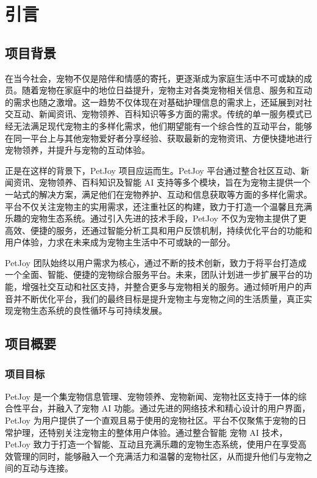 \section{引言}\label{sec:Introduction}

\subsection{项目背景}

在当今社会，宠物不仅是陪伴和情感的寄托，更逐渐成为家庭生活中不可或缺的成员。随着宠物在家庭中的地位日益提升，宠物主对各类宠物相关信息、服务和互动的需求也随之激增。这一趋势不仅体现在对基础护理信息的需求上，还延展到对社交互动、新闻资讯、宠物领养、百科知识等多方面的需求。传统的单一服务模式已经无法满足现代宠物主的多样化需求，他们期望能有一个综合性的互动平台，能够在同一平台上与其他宠物爱好者分享经验、获取最新的宠物资讯、方便快捷地进行宠物领养，并提升与宠物的互动体验。

正是在这样的背景下，PetJoy 项目应运而生。PetJoy 平台通过整合社区互动、新闻资讯、宠物领养、百科知识及智能 AI 支持等多个模块，旨在为宠物主提供一个一站式的解决方案，满足他们在宠物养护、互动和信息获取等方面的多样化需求。平台不仅关注宠物主的实用需求，还注重社区的构建，致力于打造一个温馨且充满乐趣的宠物生态系统。通过引入先进的技术手段，PetJoy 不仅为宠物主提供了更高效、便捷的服务，还通过智能分析工具和用户反馈机制，持续优化平台的功能和用户体验，力求在未来成为宠物主生活中不可或缺的一部分。

PetJoy 团队始终以用户需求为核心，通过不断的技术创新，致力于将平台打造成一个全面、智能、便捷的宠物综合服务平台。未来，团队计划进一步扩展平台的功能，增强社交互动和社区支持，并整合更多与宠物相关的服务。通过倾听用户的声音并不断优化平台，我们的最终目标是提升宠物主与宠物之间的生活质量，真正实现宠物生态系统的良性循环与可持续发展。

\subsection{项目概要}

\subsubsection{项目目标}

PetJoy 是一个集宠物信息管理、宠物领养、宠物新闻、宠物社区支持于一体的综合性平台，并融入了宠物 AI 功能。通过先进的网络技术和精心设计的用户界面，PetJoy 为用户提供了一个直观且易于使用的宠物社区。平台不仅聚焦于宠物的日常护理，还特别关注宠物主的整体用户体验。通过整合智能 宠物 AI 技术，PetJoy 致力于打造一个智能、互动且充满乐趣的宠物生态系统，使用户在享受高效管理的同时，能够融入一个充满活力和温馨的宠物社区，从而提升他们与宠物之间的互动与连接。


